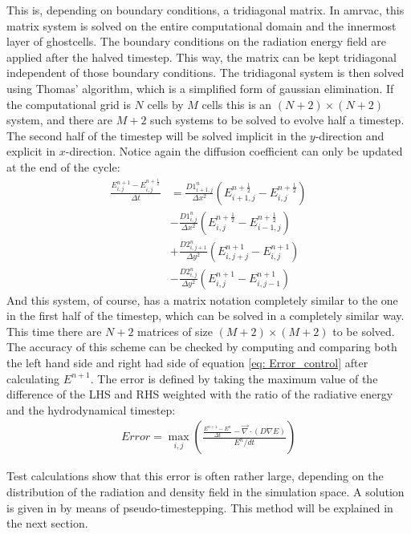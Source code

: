 This is, depending on boundary conditions, a tridiagonal matrix. In amrvac, this matrix system is solved on the entire computational domain and the innermost layer of ghostcells. The boundary conditions on the radiation energy field are applied after the halved timestep. This way, the matrix can be kept tridiagonal independent of those boundary conditions. The tridiagonal system is then solved using Thomas' algorithm, which is a simplified form of gaussian elimination. If the computational grid is $N$ cells by $M$ cells this is an $(N+2) \times (N+2)$ system, and there are $M+2$ such systems to be solved to evolve half a timestep. \\

The second half of the timestep will be solved implicit in the $y$-direction and explicit in $x$-direction. Notice again the diffusion coefficient can only be updated at the end of the cycle:
\begin{align}
\frac{E_{i,j}^{n+1} - E_{i,j}^{n+\frac{1}{2}}}{\Delta t}
 &= \frac{D1_{i+1,j}^{n}}{\Delta x^2} (E_{i+1,j}^{n+\frac{1}{2}} - E_{i,j}^{n+\frac{1}{2}}) \\
 &- \frac{D1_{i,j}^{n}}{\Delta x^2} (E_{i,j}^{n+\frac{1}{2}} - E_{i-1,j}^{n+\frac{1}{2}}) \\
 &+ \frac{D2_{i,j+1}^{n}}{\Delta y^2} (E_{i,j+j}^{n+1} - E_{i,j}^{n+1}) \\
 &- \frac{D2_{i,j}^{n}}{\Delta y^2} (E_{i,j}^{n+1} - E_{i,j-1}^{n+1})
\end{align}
And this system, of course, has a matrix notation completely similar to the one in the first half of the timestep, which can be solved in a completely similar way. This time there are $N+2$ matrices of size $(M+2) \times (M+2)$ to be solved. \\

The accuracy of this scheme can be checked by computing and comparing both the left hand side and right had side of equation \eqref{eq: Error_control} after calculating $E^{n+1}$. The error is defined by taking the maximum value of the difference of the LHS and RHS weighted with the ratio of the radiative energy and the hydrodynamical timestep:
\begin{align}
Error = \max_{i,j} \left(\frac{\frac{E^{n+1} - E^{n}}{\Delta t} -  \vec{\nabla} \cdot \left(D \nabla E\right)}{E^{n}/dt} \right) \label{eq: Error}
\end{align}

 Test calculations show that this error is often rather large, depending on the distribution of the radiation and density field in the simulation space. A solution is given in \cite{Turner12001} by means of pseudo-timestepping. This method will be explained in the next section.
 
